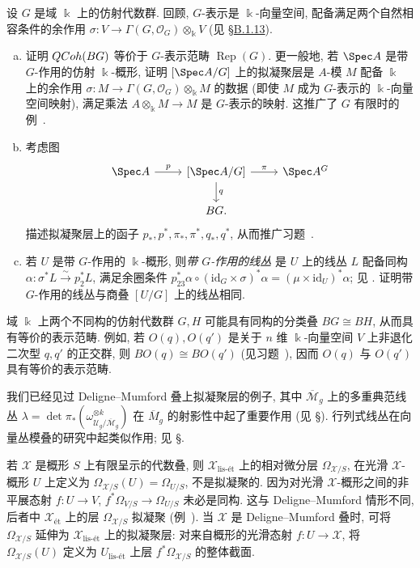 \begin{exercise}\label{src:7.1.11}
设 $G$ 是域 $\Bbbk$ 上的仿射代数群. 回顾, $G$-表示是 $\Bbbk$-向量空间, 配备满足两个自然相容条件的余作用 $\sigma:V\to\Gamma(G,\mathcal O_G)\otimes_{\Bbbk}V$ (见 \S\hyperref[src:B.1.13]{B.1.13}).
\begin{enumerate}[(a)]
\item 证明 $QCoh(BG)$ 等价于 $G$-表示范畴 $\operatorname{Rep}(G)$. 更一般地, 若 $\Spec A$ 是带 $G$-作用的仿射 $\Bbbk$-概形, 证明 $[\Spec A/G]$ 上的拟凝聚层是 $A$-模 $M$ 配备 $\Bbbk$ 上的余作用 $\sigma:M\to\Gamma(G,\mathcal O_G)\otimes_{\Bbbk}M$ 的数据 (即使 $M$ 成为 $G$-表示的 $\Bbbk$-向量空间映射), 满足乘法 $A\otimes_{\Bbbk}M\to M$ 是 $G$-表示的映射. 这推广了 $G$ 有限时的例~.
\item 考虑图
\[
\begin{tikzcd}[ampersand replacement=\&]
\Spec A\arrow[r,"{p}"]\&{[\Spec A/G]}\arrow[r,"{\pi}"]\arrow[d,"{q}"]\&\Spec A^G\\
\&BG.\&
\end{tikzcd}
\]
描述拟凝聚层上的函子 $p_*,p^*,\pi_*,\pi^*,q_*,q^*$, 从而推广习题~.
\item 若 $U$ 是带 $G$-作用的 $\Bbbk$-概形, 则\emph{带 $G$-作用的线丛} 是 $U$ 上的线丛 $L$ 配备同构 $\alpha:\sigma^*L\xrightarrow{\sim}p_2^*L$, 满足余圈条件 $p_{23}^*\alpha\circ(\mathrm{id}_G\times\sigma)^*\alpha=(\mu\times\mathrm{id}_U)^*\alpha$; 见 . 证明带 $G$-作用的线丛与商叠 $[U/G]$ 上的线丛相同.
\end{enumerate}
\end{exercise}
\begin{example}\label{src:7.1.12}
域 $\Bbbk$ 上两个不同构的仿射代数群 $G,H$ 可能具有同构的分类叠 $BG\cong BH$, 从而具有等价的表示范畴. 例如, 若 $O(q),O(q')$ 是关于 $n$ 维 $\Bbbk$-向量空间 $V$ 上非退化二次型 $q,q'$ 的正交群, 则 $BO(q)\cong BO(q')$ (见习题~), 因而 $O(q)$ 与 $O(q')$ 具有等价的表示范畴.
\end{example}
我们已经见过 Deligne--Mumford 叠上拟凝聚层的例子, 其中 $\overline{\mathcal M}_g$ 上的多重典范线丛 $\lambda=\det\pi_*(\omega_{\mathcal U_g/\overline{\mathcal M}_g}^{\otimes k})$ 在 $\overline M_g$ 的射影性中起了重要作用 (见 \S{}). 行列式线丛在向量丛模叠的研究中起类似作用; 见 \S{}.
\begin{example}\label{src:7.1.13}
若 $\mathcal X$ 是概形 $S$ 上有限呈示的代数叠, 则 $\mathcal X_{\text{lis-ét}}$ 上的相对微分层 $\Omega_{\mathcal X/S}$, 在光滑 $\mathcal X$-概形 $U$ 上定义为 $\Omega_{\mathcal X/S}(U)=\Omega_{U/S}$, 不是拟凝聚的. 因为对光滑 $\mathcal X$-概形之间的非平展态射 $f:U\to V$, $f^*\Omega_{V/S}\to\Omega_{U/S}$ 未必是同构. 这与 Deligne--Mumford 情形不同, 后者中 $\mathcal X_{\text{ét}}$ 上的层 $\Omega_{\mathcal X/S}$ 拟凝聚 (例~). 当 $\mathcal X$ 是 Deligne--Mumford 叠时, 可将 $\Omega_{\mathcal X/S}$ 延伸为 $\mathcal X_{\text{lis-ét}}$ 上的拟凝聚层: 对来自概形的光滑态射 $f:U\to\mathcal X$, 将 $\Omega_{\mathcal X/S}(U)$ 定义为 $U_{\text{lis-ét}}$ 上层 $f^*\Omega_{\mathcal X/S}$ 的整体截面.
\end{example}
